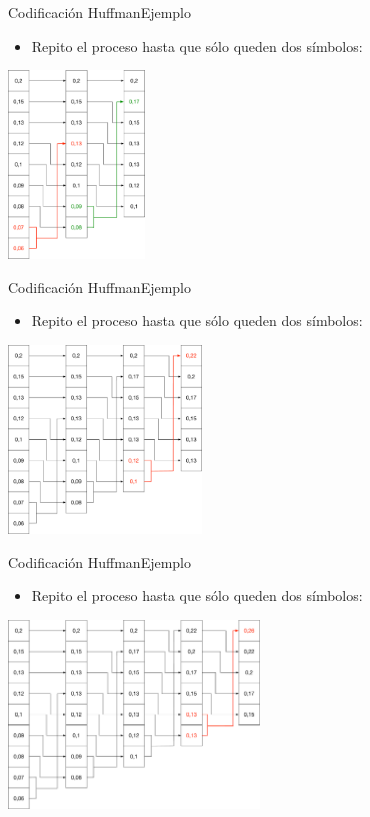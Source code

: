 \documentclass[10pt,compress]{beamer} %
\begin{document}
\begin{frame}{Codificación Huffman}{Ejemplo}
  \begin{itemize}
    \item Repito el proceso hasta que sólo queden dos símbolos:
  \end{itemize}
  \centering \includegraphics[height=5cm]{./Figuras/Huffman2.pdf}
\end{frame}

\begin{frame}{Codificación Huffman}{Ejemplo}
  \begin{itemize}
    \item Repito el proceso hasta que sólo queden dos símbolos:
  \end{itemize}
  \centering \includegraphics[height=5cm]{./Figuras/Huffman3.pdf}
\end{frame}

\begin{frame}{Codificación Huffman}{Ejemplo}
  \begin{itemize}
    \item Repito el proceso hasta que sólo queden dos símbolos:
  \end{itemize}
  \centering \includegraphics[height=5cm]{./Figuras/Huffman4.pdf}
\end{frame}
\end{document}

